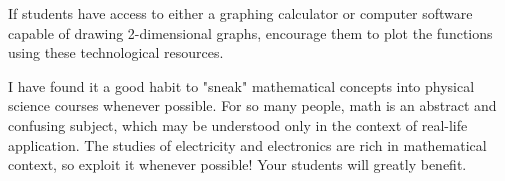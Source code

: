 If students have access to either a graphing calculator or computer software capable of drawing 2-dimensional graphs, encourage them to plot the functions using these technological resources.

I have found it a good habit to "sneak" mathematical concepts into physical science courses whenever possible.  For so many people, math is an abstract and confusing subject, which may be understood only in the context of real-life application.  The studies of electricity and electronics are rich in mathematical context, so exploit it whenever possible!  Your students will greatly benefit.




